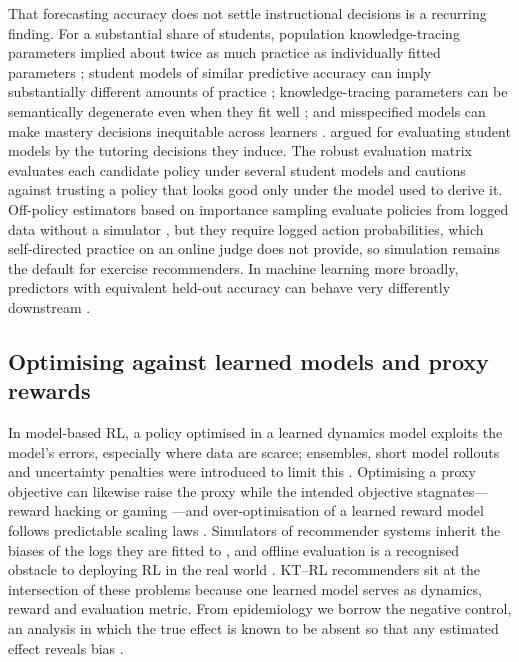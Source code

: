 \documentclass[a4paper,preprint,12pt,authoryear]{elsarticle}
\begin{document}
That forecasting accuracy does not settle instructional decisions is a recurring finding. For a substantial share of students, population knowledge-tracing parameters implied about twice as much practice as individually fitted parameters \citep{lee2012individualizing}; student models of similar predictive accuracy can imply substantially different amounts of practice \citep{rollinson2015predictive}; knowledge-tracing parameters can be semantically degenerate even when they fit well \citep{doroudi2017identifiability}; and misspecified models can make mastery decisions inequitable across learners \citep{doroudi2019fairer}. \citet{gonzalezbrenes2015leopard} argued for evaluating student models by the tutoring decisions they induce. The robust evaluation matrix \citep{doroudi2017rem} evaluates each candidate policy under several student models and cautions against trusting a policy that looks good only under the model used to derive it. Off-policy estimators based on importance sampling evaluate policies from logged data without a simulator \citep{mandel2014offline,thomas2016dataefficient}, but they require logged action probabilities, which self-directed practice on an online judge does not provide, so simulation remains the default for exercise recommenders. In machine learning more broadly, predictors with equivalent held-out accuracy can behave very differently downstream \citep{breiman2001two,damour2022underspecification}.

\subsection{Optimising against learned models and proxy rewards}

In model-based RL, a policy optimised in a learned dynamics model exploits the model's errors, especially where data are scarce; ensembles, short model rollouts and uncertainty penalties were introduced to limit this \citep{kurutach2018metrpo,janner2019trust,yu2020mopo,moerland2023mbrl,levine2020offline}. Optimising a proxy objective can likewise raise the proxy while the intended objective stagnates---reward hacking or gaming \citep{amodei2016concrete,skalse2022reward}---and over-optimisation of a learned reward model follows predictable scaling laws \citep{gao2023scaling}. Simulators of recommender systems inherit the biases of the logs they are fitted to \citep{huang2020keeping}, and offline evaluation is a recognised obstacle to deploying RL in the real world \citep{dulacarnold2021challenges}. KT--RL recommenders sit at the intersection of these problems because one learned model serves as dynamics, reward and evaluation metric. From epidemiology we borrow the negative control, an analysis in which the true effect is known to be absent so that any estimated effect reveals bias \citep{lipsitch2010negative,arnold2016negative}.
\end{document}
